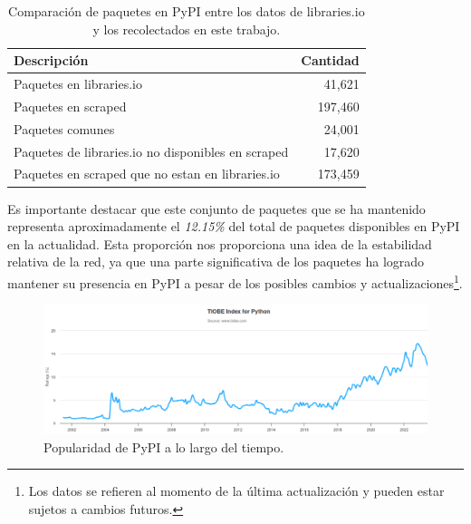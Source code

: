 \begin{table}[h!]
    \begin{center}
        \begin{tabular}{|l|r|}
            \hline
            \textbf{Descripción}                               & \textbf{Cantidad} \\
            \hline
            Paquetes en libraries.io                           & 41,621            \\
            Paquetes en scraped                                & 197,460           \\
            Paquetes comunes                                   & 24,001            \\
            Paquetes de libraries.io no disponibles en scraped & 17,620            \\
            Paquetes en scraped que no estan en libraries.io   & 173,459           \\
            \hline
        \end{tabular}
    \end{center}
    \label{tab:pypi_common_packages}
    \caption{Comparación de paquetes en PyPI entre los datos de libraries.io y los recolectados en este trabajo.}
\end{table}

Es importante destacar que este conjunto de paquetes que se ha mantenido representa aproximadamente
el \textit{12.15\%} del total de paquetes disponibles en PyPI en la actualidad. Esta proporción nos
proporciona una idea de la estabilidad relativa de la red, ya que una parte significativa de los
paquetes ha logrado mantener su presencia en PyPI a pesar de los posibles cambios y
actualizaciones\footnote{Los datos se refieren al momento de la última actualización y pueden estar
    sujetos a cambios futuros.}.

\begin{figure}[h!]
    \begin{center}
        \includegraphics[width=1\textwidth]{img/pypi/pypi_popularity.png}
        \caption{Popularidad de PyPI a lo largo del tiempo.}
        \label{fig:pypi_popularity}
    \end{center}
\end{figure}



